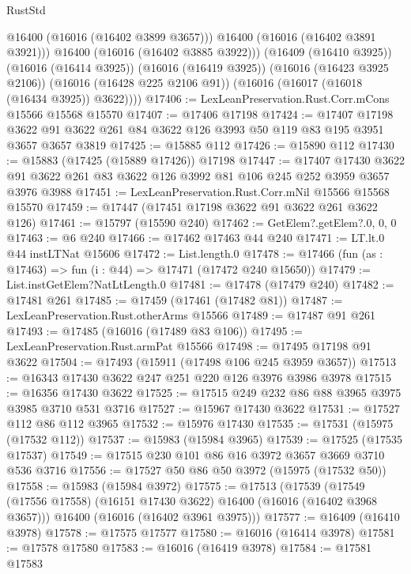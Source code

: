 \begin{lexlean}{RustStd}
\begin{coremodule}
              @16400
              (@16016 (@16402 @3899 @3657)))
            @16400
            (@16016 (@16402 @3891 @3921)))
          @16400
          (@16016 (@16402 @3885 @3922)))
        (@16409 (@16410 @3925))
        (@16016 (@16414 @3925))
        (@16016 (@16419 @3925))
        (@16016 (@16423 @3925 @2106))
        (@16016 (@16428 @225 @2106 @91))
        (@16016 (@16017 (@16018 (@16434 @3925)) @3622))))
@17406 := LexLeanPreservation.Rust.Corr.mCons @15566 @15568 @15570
@17407 := @17406 @17198
@17424 := @17407
    @17198
    @3622
    @91
    @3622
    @261
    @84
    @3622
    @126
    @3993
    @50
    @119
    @83
    @195
    @3951
    @3657
    @3657
    @3819
@17425 := @15885 @112
@17426 := @15890 @112
@17430 := @15883 (@17425 (@15889 @17426)) @17198
@17447 := @17407
    @17430
    @3622
    @91
    @3622
    @261
    @83
    @3622
    @126
    @3992
    @81
    @106
    @245
    @252
    @3959
    @3657
    @3976
    @3988
@17451 := LexLeanPreservation.Rust.Corr.mNil @15566 @15568 @15570
@17459 := @17447 (@17451 @17198 @3622 @91 @3622 @261 @3622 @126)
@17461 := @15797 (@15590 @240)
@17462 := GetElem?.getElem?.{0, 0, 0}
@17463 := @6 @240
@17466 := @17462 @17463 @44 @240
@17471 := LT.lt.{0} @44 instLTNat @15606
@17472 := List.length.{0}
@17478 := @17466 (fun (as : @17463) => fun (i : @44) => @17471 (@17472 @240 @15650))
@17479 := List.instGetElem?NatLtLength.{0}
@17481 := @17478 (@17479 @240)
@17482 := @17481 @261
@17485 := @17459 (@17461 (@17482 @81))
@17487 := LexLeanPreservation.Rust.otherArms @15566
@17489 := @17487 @91 @261
@17493 := @17485 (@16016 (@17489 @83 @106))
@17495 := LexLeanPreservation.Rust.armPat @15566
@17498 := @17495 @17198 @91 @3622
@17504 := @17493 (@15911 (@17498 @106 @245 @3959 @3657))
@17513 := @16343 @17430 @3622 @247 @251 @220 @126 @3976 @3986 @3978
@17515 := @16356 @17430 @3622
@17525 := @17515 @249 @232 @86 @88 @3965 @3975 @3985 @3710 @531 @3716
@17527 := @15967 @17430 @3622
@17531 := @17527 @112 @86 @112 @3965
@17532 := @15976 @17430
@17535 := @17531 (@15975 (@17532 @112))
@17537 := @15983 (@15984 @3965)
@17539 := @17525 (@17535 @17537)
@17549 := @17515 @230 @101 @86 @16 @3972 @3657 @3669 @3710 @536 @3716
@17556 := @17527 @50 @86 @50 @3972 (@15975 (@17532 @50))
@17558 := @15983 (@15984 @3972)
@17575 := @17513
    (@17539
      (@17549 (@17556 @17558) (@16151 @17430 @3622) @16400 (@16016 (@16402 @3968 @3657)))
      @16400
      (@16016 (@16402 @3961 @3975)))
@17577 := @16409 (@16410 @3978)
@17578 := @17575 @17577
@17580 := @16016 (@16414 @3978)
@17581 := @17578 @17580
@17583 := @16016 (@16419 @3978)
@17584 := @17581 @17583

\end{coremodule}
\end{lexlean}
